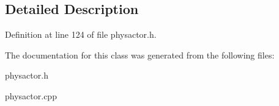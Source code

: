 \subsection{Detailed Description}


Definition at line 124 of file physactor.h.

The documentation for this class was generated from the following files:\begin{DoxyCompactItemize}
\item 
physactor.h\item 
physactor.cpp\end{DoxyCompactItemize}
